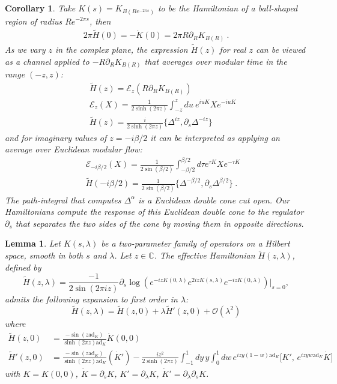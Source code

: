 \documentclass[a4paper,11pt]{article}
\newtheorem{lemma}[theorem]{Lemma}
\newtheorem{corollary}[theorem]{Corollary}
\theoremstyle{definition}
\newcommand{\nn}{\nonumber}
\newcommand{\p}{\partial}
\newcommand{\ad}{\text{ad}}
\begin{document}
\begin{corollary}
Take $K(s)=K_{B(R e^{-2\pi s})}$ to be the Hamiltonian of a ball-shaped region of radius $R e^{-2\pi s}$, then
\begin{eqnarray}
2\pi \tilde{H}(0)={-}\dot{K}(0)=2\pi R\p_R K_{B(R)}\ .
\end{eqnarray}
As we vary $z$ in the complex plane, the expression $\tilde{H}(z)$ for real $z$ can be viewed as a channel applied to $-R \p_R K_{B(R)}$ that averages over modular time in the range $(-z,z)$:
\begin{eqnarray}
    &&\tilde{H}(z)=\mathcal{E}_z(R \p_R K_{B(R)})\nn\\
    &&\mathcal{E}_z(X)=\frac{1}{2\sinh(2\pi z)} \int_{-z}^z du \: e^{i u K} X e^{-i u K} \nn\\
    &&\tilde{H}(z)=\frac{i}{2\sinh(2\pi z)}\{\Delta^{iz},\p_s \Delta^{-iz}\}
\end{eqnarray}
and for imaginary values of $z=-i\beta/2$ it can be interpreted as applying an average over Euclidean modular flow:
\begin{eqnarray}
    &&\mathcal{E}_{-i\beta/2}(X)=\frac{1}{2\sin(\beta/2)}\int_{-\beta/2}^{\beta/2}d\tau e^{\tau K} X e^{-\tau K}\nn\\
    &&\tilde{H}(-i\beta/2)=\frac{1}{2\sin(\beta/2)}\{\Delta^{-\beta/2},\p_s \Delta^{\beta/2}\}\ .
\end{eqnarray}
The path-integral that computes $\Delta^\alpha$ is a Euclidean double cone cut open. Our Hamiltonians compute the response of this Euclidean double cone to the regulator $\p_s$ that separates the two sides of the cone by moving them in opposite directions.
    
\end{corollary}

\begin{lemma}\label{lemmaperturbApp}
Let $K(s, \lambda)$ be a two-parameter family of operators on a Hilbert space, smooth in both $s$ and $\lambda$. Let $z \in \mathbb{C}$. 
The effective Hamiltonian $\tilde{H}(z, \lambda)$, defined by
\begin{equation}
    \tilde{H}(z, \lambda) = \frac{{-}1}{2\sin(2\pi iz)} \p_s \log \left( e^{-iz K(0, \lambda)} e^{2iz K(s, \lambda)} e^{-iz K(0, \lambda)} \right) \Big|_{s=0},
\end{equation}
admits the following expansion to first order in $\lambda$:
\begin{equation}
    \tilde{H}(z, \lambda) = \tilde{H}(z,0) + \lambda \tilde{H}'(z,0) + \mathcal{O}(\lambda^2)
\end{equation}
where 
\begin{align}
    \tilde{H}(z,0) &= \frac{{-}\sin(z \ad_K)}{\sinh(2\pi z) \ad_K} \dot{K}(0,0) \\
    \tilde{H}'(z,0) &= \frac{{-}\sin(z \ad_K)}{\sinh(2\pi z) \ad_K} (\dot{K}') {-}\frac{iz^2}{2\sinh(2\pi z)} \int_{-1}^{1} dy \, y \int_0^1 dw \, e^{izy(1-w)\ad_K} \Big[ K', \, e^{izyw\ad_K} \dot{K} \Big]
\end{align}
with $K = K(0,0)$, $\dot{K} = \p_s K$, $K' = \p_\lambda K$, $\dot{K}' = \p_\lambda \p_s K$. 
\end{lemma}
\end{document}
